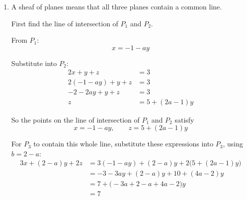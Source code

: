 \documentclass[leqno]{article}
\begin{document}
\begin{enumerate}[
  label=\textbf{\arabic*.},
  leftmargin=*,
  topsep=0pt,
  partopsep=0pt,
  parsep=0pt
]
\begin{djsSolution}
\begin{enumerate}[label=\textbf{(\alph*)}]
\begin{enumerate}[label=(\roman*)]
    So
    \begin{align*}
    \det(\mathbf{A})
    &=
    \begin{vmatrix}
    1 & a & 0\\
    2 & 1 & 1\\
    3 & b & 2
    \end{vmatrix} \\
    &=1
    \begin{vmatrix}
    1 & 1\\
    b & 2
    \end{vmatrix}
    -a
    \begin{vmatrix}
    2 & 1\\
    3 & 2
    \end{vmatrix}
    +0
    \begin{vmatrix}
    2 & 1\\
    3 & b
    \end{vmatrix} \\
    &=1(2-b)-a(4-3) \\
    &=2-b-a
    \end{align*}

    In the case where the planes do \textbf{not} intersect at a unique point, we need
    \[
    \det(\mathbf{A})=0
    \]

    so
    \begin{align*}
    2-b-a&=0\\
    b&=2-a
    \end{align*}

    \item A sheaf of planes means that all three planes contain a common line.

    First find the line of intersection of \(P_1\) and \(P_2\).

    From \(P_1\):
    \[
    x=-1-ay
    \]

    Substitute into \(P_2\):
    \begin{align*}
    2x+y+z&=3\\
    2(-1-ay)+y+z&=3\\
    -2-2ay+y+z&=3\\
    z&=5+(2a-1)y
    \end{align*}

    So the points on the line of intersection of \(P_1\) and \(P_2\) satisfy
    \[
    x=-1-ay,\qquad z=5+(2a-1)y
    \]

    For \(P_3\) to contain this whole line, substitute these expressions into \(P_3\), using \(b=2-a\):
    \begin{align*}
    3x+(2-a)y+2z
    &=3(-1-ay)+(2-a)y+2\bigl(5+(2a-1)y\bigr)\\
    &=-3-3ay+(2-a)y+10+(4a-2)y\\
    &=7+\bigl(-3a+2-a+4a-2\bigr)y\\
    &=7
    \end{align*}


\end{enumerate}
\end{enumerate}
\end{djsSolution}
\end{enumerate}
\end{document}
